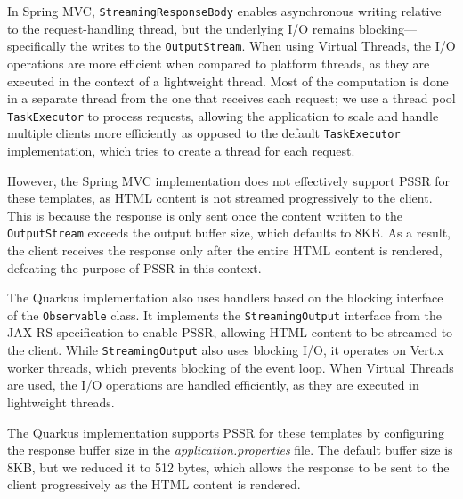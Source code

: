 In Spring MVC, \texttt{StreamingResponseBody} enables asynchronous writing
relative to the request-handling thread, but the underlying I/O remains
blocking—specifically the writes to the \texttt{OutputStream}. When using
Virtual Threads, the I/O operations are more efficient when compared to
platform threads, as they are executed in the context of a lightweight thread.
Most of the computation is done in a separate thread from the one that receives
each request; we use a thread pool \texttt{TaskExecutor} to process requests,
allowing the application to scale and handle multiple clients more efficiently
as opposed to the default \texttt{TaskExecutor} implementation, which tries to
create a thread for each request.

However, the Spring MVC implementation does not effectively support PSSR for
these templates, as HTML content is not streamed progressively to the client.
This is because the response is only sent once the content written to the
\texttt{OutputStream} exceeds the output buffer size, which defaults to 8KB\@.
As a result, the client receives the response only after the entire HTML
content is rendered, defeating the purpose of PSSR in this context.

The Quarkus implementation also uses handlers based on the blocking interface
of the \texttt{Observable} class. It implements the \texttt{StreamingOutput}
interface from the JAX-RS specification to enable PSSR, allowing HTML content
to be streamed to the client. While \texttt{StreamingOutput} also uses blocking
I/O, it operates on Vert.x worker threads, which prevents blocking of the event
loop. When Virtual Threads are used, the I/O operations are handled
efficiently, as they are executed in lightweight threads.

The Quarkus implementation supports PSSR for these templates by configuring the
response buffer size in the \textit{application.properties} file. The default
buffer size is 8KB, but we reduced it to 512 bytes, which allows the response
to be sent to the client progressively as the HTML content is rendered.
